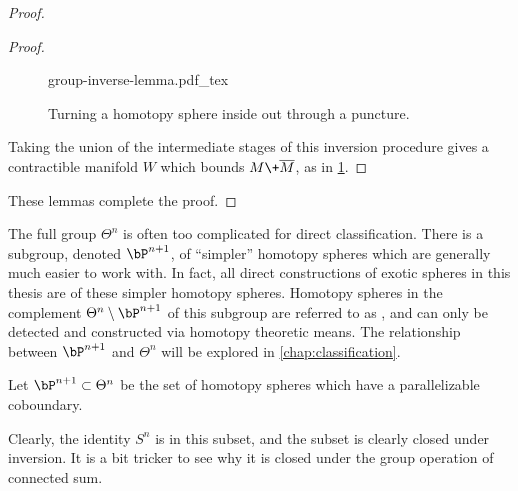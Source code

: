 \begin{proof}
\begin{proof}
		\begin{figure}[ht]
			\centering
			{group-inverse-lemma.pdf_tex}
			\caption{Turning a homotopy sphere inside out through a puncture.}\label{fig:group-inverse-lemma}
		\end{figure}

		\noindent
		Taking the union of the intermediate stages of this inversion procedure gives a contractible manifold $W$ which bounds $M\+\overline{M}$, as in \cref{fig:group-inverse-lemma}.
	\end{proof}

	\noindent
	These lemmas complete the proof.
\end{proof}


The full group $\Theta^n$ is often too complicated for direct classification. There is a subgroup, denoted $\bP^{n+1}$, of ``simpler'' homotopy spheres which are generally much easier to work with. In fact, all direct constructions of exotic spheres in this thesis are of these simpler homotopy spheres. Homotopy spheres in the complement $\Theta^n\setminus \bP^{n+1}$ of this subgroup are referred to as , and can only be detected and constructed via homotopy theoretic means. The relationship between $\bP^{n+1}$ and $\Theta^n$ will be explored in \cref{chap:classification}.

\begin{definition}
	Let $\bP^{n+1}\subset \Theta^n$ be the set of homotopy spheres which have a parallelizable coboundary.
\end{definition}

Clearly, the identity $S^n$ is in this subset, and the subset is clearly closed under inversion. It is a bit tricker to see why it is closed under the group operation of connected sum. 

